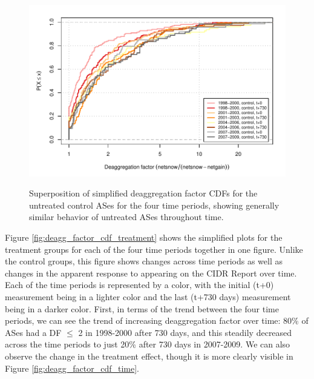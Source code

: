 \begin{figure}[H]
\begin{centering}
\begin{singlespace}
    \includegraphics[width=6in]{figures/behavior-deagg_factor-all-special_c.pdf}
    \vspace{-2em}\\
    \caption[Superposition of simplified deaggregation factor CDFs for the
    untreated control ASes]{Superposition of simplified deaggregation factor
    CDFs for the untreated control ASes for the four time periods, showing
    generally similar behavior of untreated ASes throughout time.}
    \label{fig:deagg_factor_cdf_control}
\end{singlespace}
\end{centering}
\end{figure}

Figure \ref{fig:deagg_factor_cdf_treatment} shows the simplified plots for the
treatment groups for each of the four time periods together in one figure.
Unlike the control groups, this figure shows changes across time periods as
well as changes in the apparent response to appearing on the CIDR Report over
time. Each of the time periods is represented by a color, with the initial
(t+0) measurement being in a lighter color and the last (t+730 days)
measurement being in a darker color. First, in terms of the trend between the
four time periods, we can see the trend of increasing deaggregation factor over
time: 80\% of ASes had a DF $\le$ 2 in 1998-2000 after 730 days, and this
steadily decreased across the time periods to just 20\% after 730 days in
2007-2009. We can also observe the change in the treatment effect, though it is
more clearly visible in Figure \ref{fig:deagg_factor_cdf_time}.

